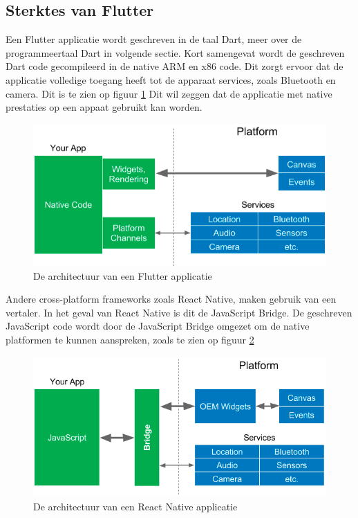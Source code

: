 \subsection{Sterktes van Flutter}
Een Flutter applicatie wordt geschreven in de taal Dart, meer over de programmeertaal Dart in volgende sectie. Kort samengevat wordt de geschreven Dart code gecompileerd in de native ARM en x86 code. 
Dit zorgt ervoor dat de applicatie volledige toegang heeft tot de apparaat services, zoals Bluetooth en camera. Dit is te zien op figuur \ref{fig:flutter-app-architecture}
Dit wil zeggen dat de applicatie met native prestaties op een appaat gebruikt kan worden.

\begin{figure}[H]
    \centering
    \includegraphics[width=\figureWidthModifier\linewidth]{img/stand-van-zaken/flutter-app-architecture.png}
    \caption{De architectuur van een Flutter applicatie}
    \label{fig:flutter-app-architecture}
\end{figure}

Andere cross-platform frameworks zoals React Native, maken gebruik van een vertaler. In het geval van React Native is dit de JavaScript Bridge. De geschreven JavaScript code wordt door de JavaScript Bridge omgezet om de native platformen te kunnen aanspreken, zoals te zien op figuur \ref{fig:react-native-app-architecture}  \autocite{Kuitunen2019}

\begin{figure}[H]
    \centering
    \includegraphics[width=\figureWidthModifier\linewidth]{img/stand-van-zaken/react-native-app-architecture.png}
    \caption{De architectuur van een React Native applicatie}
    \label{fig:react-native-app-architecture}
\end{figure}

